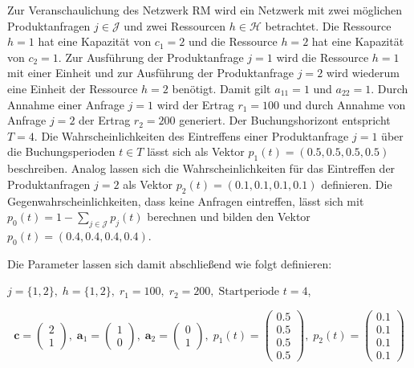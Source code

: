 

Zur Veranschaulichung des Netzwerk RM wird ein Netzwerk mit zwei möglichen Produktanfragen $j\in\mathcal{J}$ und zwei Ressourcen $h\in\mathcal{H}$ betrachtet. Die Ressource $h=1$ hat eine Kapazität von $c_{1}=2$ und die Ressource $h=2$ hat eine Kapazität von $c_{2}=1$. Zur Ausführung der Produktanfrage $j=1$ wird die Ressource $h=1$ mit einer Einheit und zur Ausführung der Produktanfrage $j=2$ wird wiederum eine Einheit der Ressource $h=2$ benötigt. Damit gilt $a_{11}=1$ und $a_{22}=1$. Durch Annahme einer Anfrage $j=1$ wird der Ertrag $r_{1}=100$ und durch Annahme von Anfrage $j=2$ der Ertrag $r_{2}=200$ generiert. Der Buchungshorizont entspricht $T=4$. Die Wahrscheinlichkeiten des Eintreffens einer Produktanfrage $j=1$ über die Buchungsperioden $t\in T$ lässt sich als Vektor $p_{1}(t)=(0.5, 0.5, 0.5, 0.5)$ beschreiben. Analog lassen sich die Wahrscheinlichkeiten für das Eintreffen der Produktanfragen $j=2$ als Vektor $p_{2}(t)=(0.1, 0.1, 0.1, 0.1)$ definieren. Die Gegenwahrscheinlichkeiten, dass keine Anfragen eintreffen, lässt sich mit $p_{0}(t)=1-\sum_{j\in \mathcal{J}}p_{j}(t)$ berechnen und bilden den Vektor $p_{0}(t)=(0.4, 0.4, 0.4, 0.4)$.

Die Parameter lassen sich damit abschließend wie folgt definieren:
\begin{center}
$j = \{1, 2\}, \; h = \{1, 2\}, \; r_{1} = 100, \; r_{2} = 200, \; \text{Startperiode } t=4$,
\end{center}
\[
    \textbf{c}=\begin{pmatrix} 2 \\ 1 \end{pmatrix}, \;
    \textbf{a}_1=\begin{pmatrix} 1 \\ 0 \end{pmatrix}, \;
     \textbf{a}_2=\begin{pmatrix} 0 \\ 1 \end{pmatrix}, \;
     p_{1}(t)=\begin{pmatrix} 0.5\\ 0.5\\ 0.5\\ 0.5  \end{pmatrix}, \;
     p_{2}(t)=\begin{pmatrix} 0.1\\ 0.1\\ 0.1\\ 0.1  \end{pmatrix}
  \]


